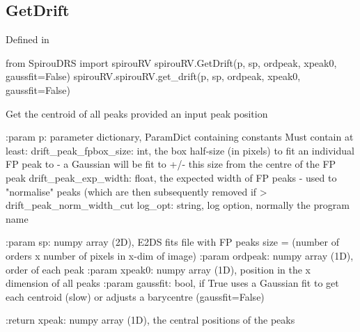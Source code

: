 \noindent\begin{minipage}{\textwidth}
\subsection{GetDrift}

Defined in \spirouRV{}

\begin{pythonbox}
from SpirouDRS import spirouRV
spirouRV.GetDrift(p, sp, ordpeak, xpeak0, gaussfit=False)
spirouRV.spirouRV.get_drift(p, sp, ordpeak, xpeak0, gaussfit=False)
\end{pythonbox}

\begin{pythondocstring}
Get the centroid of all peaks provided an input peak position

:param p: parameter dictionary, ParamDict containing constants
    Must contain at least:
            drift_peak_fpbox_size: int, the box half-size (in pixels) to
                                   fit an individual FP peak to - a
                                   Gaussian will be fit to +/- this size
                                   from the centre of the FP peak
            drift_peak_exp_width: float, the expected width of FP peaks -
                                  used to "normalise" peaks (which are then
                                  subsequently removed if >
                                  drift_peak_norm_width_cut
            log_opt: string, log option, normally the program name

:param sp: numpy array (2D), E2DS fits file with FP peaks
           size = (number of orders x number of pixels in x-dim of image)
:param ordpeak: numpy array (1D), order of each peak
:param xpeak0: numpy array (1D), position in the x dimension of all peaks
:param gaussfit: bool, if True uses a Gaussian fit to get each centroid
                 (slow) or adjusts a barycentre (gaussfit=False)

:return xpeak: numpy array (1D), the central positions of the peaks
\end{pythondocstring}
\end{minipage}

